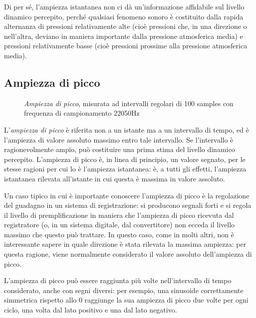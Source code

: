 Di per sé, l'ampiezza istantanea non ci dà un'informazione affidabile sul livello dinamico percepito, perché qualsiasi fenomeno sonoro è costituito dalla rapida alternanza di pressioni relativamente alte (cioè pressioni che, in una direzione o nell'altra, deviano in maniera importante dalla pressione atmosferica media) e pressioni relativamente basse (cioè pressioni prossime alla pressione atmosferica media). 


\subsection{Ampiezza di picco}

\begin{figure}
    \begin{center}
       \scalebox{0.6} {}
    \end{center}
    \caption{\emph{Ampiezza di picco}, misurata ad intervalli regolari di 100 samples con frequenza di campionamento 22050Hz}
\end{figure}

L'\emph{ampiezza di picco} è riferita non a un istante ma a un intervallo di tempo, ed è l'ampiezza di valore assoluto massimo entro tale intervallo. Se l'intervallo è ragionevolmente ampio, può costituire una prima stima del livello dinamico percepito. L'ampiezza di picco è, in linea di principio, un valore segnato, per le stesse ragioni per cui lo è l'ampiezza istantanea: è, a tutti gli effetti, l'ampiezza istantanea rilevata all'istante in cui questa è massima in valore assoluto.

Un caso tipico in cui è importante conoscere l'ampiezza di picco è la regolazione del guadagno in un sistema di registrazione: si producono segnali forti e si regola il livello di premplificazione in maniera che l'ampiezza di picco ricevuta dal registratore (o, in un sistema digitale, dal convertitore) non ecceda il livello massimo che questo può trattare. In questo caso, come in molti altri, non è interessante sapere in quale direzione è stata rilevata la massima ampiezza: per questa ragione, viene normalmente considerato il valore assoluto dell'ampiezza di picco. 

L'ampiezza di picco può essere raggiunta più volte nell'intervallo di tempo considerato, anche con segni diversi: per esempio, una sinusoide correttamente simmetrica rispetto allo 0 raggiunge la sua ampiezza di picco due volte per ogni ciclo, una volta dal lato positivo e una dal lato negativo.



